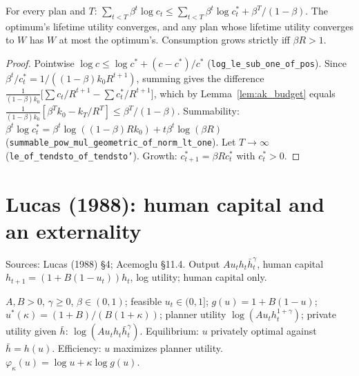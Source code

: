 \begin{theorem}
\label{thm:ak_optimal}
\leanok
{}
For every plan and $T$: $\sum_{t<T}\beta^t\log c_t \le \sum_{t<T}\beta^t \log c^*_t + \beta^T/(1-\beta)$. The optimum's
lifetime utility converges, and any plan whose lifetime utility converges to $W$ has $W$ at most the optimum's.
Consumption grows strictly iff $\beta R > 1$.
\end{theorem}
\begin{proof}
\leanok
Pointwise $\log c \le \log c^* + (c - c^*)/c^*$ (\texttt{log\_le\_sub\_one\_of\_pos}). Since
$\beta^t/c^*_t = 1/((1-\beta)k_0R^{t+1})$, summing gives the difference
$\frac{1}{(1-\beta)k_0}\big[\sum c_t/R^{t+1} - \sum c^*_t/R^{t+1}\big]$, which by Lemma~\ref{lem:ak_budget} equals
$\frac{1}{(1-\beta)k_0}[\beta^Tk_0 - k_T/R^T] \le \beta^T/(1-\beta)$. Summability: $\beta^t\log c^*_t =
\beta^t\log((1-\beta)Rk_0) + t\beta^t\log(\beta R)$ (\texttt{summable\_pow\_mul\_geometric\_of\_norm\_lt\_one}). Let
$T \to \infty$ (\texttt{le\_of\_tendsto\_of\_tendsto'}). Growth: $c^*_{t+1} = \beta R c^*_t$ with $c^*_t > 0$.
\end{proof}

\section{Lucas (1988): human capital and an externality}
\label{sec:lucas}

Sources: Lucas (1988) \S4; Acemoglu \S11.4. Output $A u_t h_t \bar h_t^\gamma$, human capital
$h_{t+1} = (1 + B(1-u_t))h_t$, log utility; human capital only.

\begin{definition}
\label{def:lucas}
\leanok
$A, B > 0$, $\gamma \ge 0$, $\beta \in (0,1)$; feasible $u_t \in (0, 1]$; $g(u) = 1 + B(1-u)$;
$u^*(\kappa) = (1+B)/(B(1+\kappa))$; planner utility $\log(Au_th_t^{1+\gamma})$; private utility given $\bar h$:
$\log(Au_th_t\bar h_t^\gamma)$. Equilibrium: $u$ privately optimal against $\bar h = h(u)$. Efficiency: $u$ maximizes
planner utility. $\varphi_\kappa(u) = \log u + \kappa\log g(u)$.
\end{definition}

